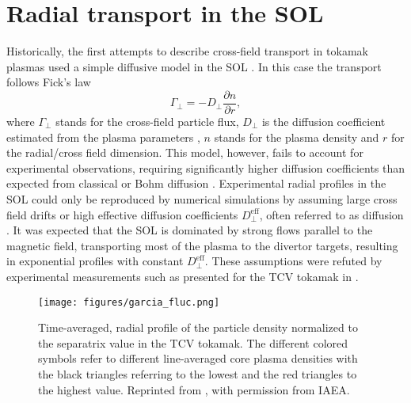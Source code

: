 \section{Radial transport in the SOL}
 Historically, the first attempts to describe cross-field transport in tokamak plasmas used
 a simple diffusive model in the SOL \cite{connor1999comparison}. In this case the transport follows Fick's law
 \begin{equation}
 	\Gamma_\perp = - D_\perp \frac{\partial n}{\partial r},
 \end{equation}
where $\Gamma_\perp$ stands for the cross-field particle flux, $D_\perp$ is the diffusion coefficient estimated from the plasma parameters \cite{Bohm1949}, $n$ stands for the plasma density and $r$ for the radial/cross field dimension. This model, however, fails to account for experimental observations, requiring significantly higher diffusion coefficients than expected from classical or Bohm diffusion \cite{lipschultz2002investigation,krasheninnikov2008recent}. Experimental radial profiles in the SOL could only be reproduced by numerical simulations by assuming large cross field drifts or high effective diffusion coefficients $D_\perp^\textrm{eff}$, often referred to as  diffusion \cite{wesson2011tokamaks}. It was expected that the SOL is dominated by strong flows parallel to the magnetic field, transporting most of the plasma to the divertor targets, resulting in exponential profiles with constant $D_\perp^\textrm{eff}$. These assumptions were refuted by experimental measurements such as presented for the TCV tokamak in .
  \begin{figure}[t]
	\centering
	\texttt{[image: figures/garcia\_fluc.png]}
	\caption{Time-averaged, radial profile of the particle density normalized to the separatrix value in the TCV tokamak. The different colored symbols refer to different line-averaged core plasma densities with the black triangles referring to the lowest and the red triangles to the highest value. Reprinted from \cite{garcia2007fluctuations}, with permission from IAEA.}
	\label{Fig:garcia_fluc}
\end{figure}
